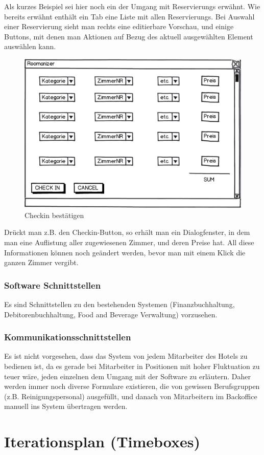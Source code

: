 \documentclass[10pt,a4paper,titlepage]{article}
\begin{document}
Als kurzes Beispiel sei hier noch ein der Umgang mit \Glspl{Reservierung} erwähnt. Wie bereits erwähnt enthält ein Tab eine Liste mit allen \Glspl{Reservierung}. Bei Auswahl einer \Gls{Reservierung} sieht man rechts eine editierbare Vorschau, und einige Buttons, mit denen man Aktionen auf Bezug des aktuell ausgewählten Element auswählen kann.

\begin{figure}[h]
	\includegraphics[width=\linewidth]{Images/GUI_Dialog.png}
	\caption{Checkin bestätigen}
\end{figure}

Drückt man z.B. den  \Gls{Checkin}-Button, so erhält man ein Dialogfenster, in dem man eine Auflistung aller zugewiesenen \Gls{Zimmer}, und deren Preise hat. All diese Informationen können noch geändert werden, bevor man mit einem Klick die ganzen \Gls{Zimmer} vergibt.
\subsubsection{Software Schnittstellen}
Es sind Schnittstellen zu den bestehenden Systemen (Finanzbuchhaltung, Debitorenbuchhaltung, Food and Beverage Verwaltung) vorzusehen.
\subsubsection{Kommunikationsschnittstellen}
Es ist nicht vorgesehen, dass das System von jedem \Gls{Mitarbeiter} des Hotels zu bedienen ist, da es gerade bei \Gls{Mitarbeiter} in Positionen mit hoher Fluktuation zu teuer wäre, jeden einzelnen dem Umgang mit der Software zu erläutern. Daher werden immer noch diverse Formulare existieren, die von gewissen Berufsgruppen (z.B. Reinigungspersonal) ausgefüllt, und danach von \Gls{Mitarbeiter}n im \Gls{Backoffice} manuell ins System übertragen werden.

\newpage

\section{Iterationsplan (Timeboxes)}


\newpage

\printglossary[title=Glossar,toctitle=GLOSSAR]

\newpage

\listoffigures
\end{document}
